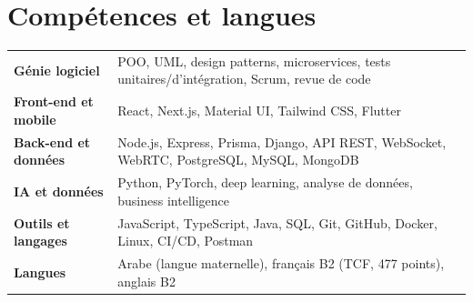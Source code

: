 \documentclass[10pt,a4paper]{article}
\begin{document}
\section{Compétences et langues}
\begin{tabularx}{\textwidth}{@{}>{\bfseries}p{3.6cm}X@{}}
Génie logiciel      & POO, UML, design patterns, microservices, tests unitaires/d'intégration, Scrum, revue de code \\
Front-end et mobile & React, Next.js, Material UI, Tailwind CSS, Flutter \\
Back-end et données & Node.js, Express, Prisma, Django, API REST, WebSocket, WebRTC, PostgreSQL, MySQL, MongoDB \\
IA et données       & Python, PyTorch, deep learning, analyse de données, business intelligence \\
Outils et langages  & JavaScript, TypeScript, Java, SQL, Git, GitHub, Docker, Linux, CI/CD, Postman \\
Langues             & Arabe (langue maternelle), français B2 (TCF, 477 points), anglais B2 \\
\end{tabularx}
\end{document}
